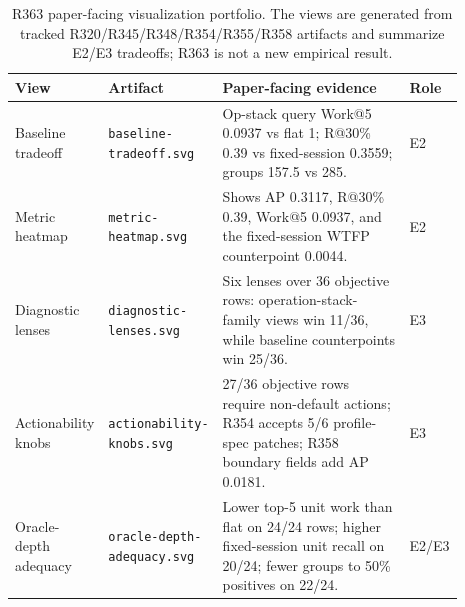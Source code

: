 \begin{table}[t]
\centering
\scriptsize
\setlength{\tabcolsep}{3pt}
\caption{R363 paper-facing visualization portfolio. The views are generated from tracked R320/R345/R348/R354/R355/R358 artifacts and summarize E2/E3 tradeoffs; R363 is not a new empirical result.}
\label{tab:visualization-portfolio}
\begin{tabular}{p{0.16\linewidth}p{0.19\linewidth}p{0.45\linewidth}p{0.09\linewidth}}
\toprule
View & Artifact & Paper-facing evidence & Role \\
\midrule
Baseline tradeoff & \texttt{baseline-tradeoff.svg} & Op-stack query Work@5 0.0937 vs flat 1; R@30\% 0.39 vs fixed-session 0.3559; groups 157.5 vs 285. & E2 \\
Metric heatmap & \texttt{metric-heatmap.svg} & Shows AP 0.3117, R@30\% 0.39, Work@5 0.0937, and the fixed-session WTFP counterpoint 0.0044. & E2 \\
Diagnostic lenses & \texttt{diagnostic-lenses.svg} & Six lenses over 36 objective rows: operation-stack-family views win 11/36, while baseline counterpoints win 25/36. & E3 \\
Actionability knobs & \texttt{actionability-knobs.svg} & 27/36 objective rows require non-default actions; R354 accepts 5/6 profile-spec patches; R358 boundary fields add AP 0.0181. & E3 \\
Oracle-depth adequacy & \texttt{oracle-depth-adequacy.svg} & Lower top-5 unit work than flat on 24/24 rows; higher fixed-session unit recall on 20/24; fewer groups to 50\% positives on 22/24. & E2/E3 \\
\bottomrule
\end{tabular}
\end{table}
